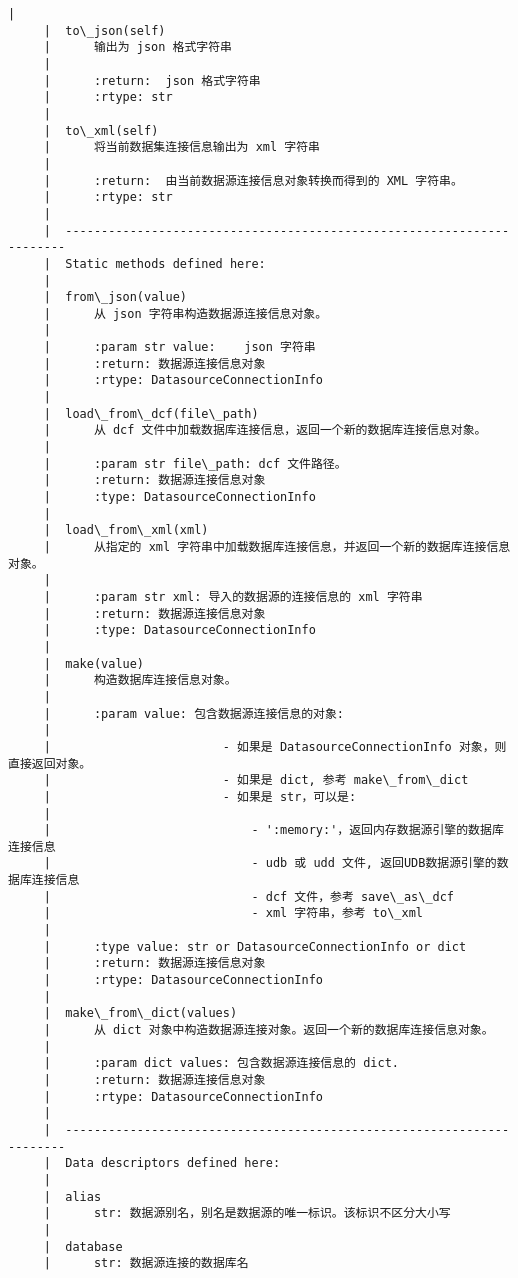 \documentclass[11pt]{article}
\begin{document}
\begin{Verbatim}[commandchars=\\\{\}]
     |  
     |  to\_json(self)
     |      输出为 json 格式字符串
     |      
     |      :return:  json 格式字符串
     |      :rtype: str
     |  
     |  to\_xml(self)
     |      将当前数据集连接信息输出为 xml 字符串
     |      
     |      :return:  由当前数据源连接信息对象转换而得到的 XML 字符串。
     |      :rtype: str
     |  
     |  ----------------------------------------------------------------------
     |  Static methods defined here:
     |  
     |  from\_json(value)
     |      从 json 字符串构造数据源连接信息对象。
     |      
     |      :param str value:    json 字符串
     |      :return: 数据源连接信息对象
     |      :rtype: DatasourceConnectionInfo
     |  
     |  load\_from\_dcf(file\_path)
     |      从 dcf 文件中加载数据库连接信息，返回一个新的数据库连接信息对象。
     |      
     |      :param str file\_path: dcf 文件路径。
     |      :return: 数据源连接信息对象
     |      :type: DatasourceConnectionInfo
     |  
     |  load\_from\_xml(xml)
     |      从指定的 xml 字符串中加载数据库连接信息，并返回一个新的数据库连接信息对象。
     |      
     |      :param str xml: 导入的数据源的连接信息的 xml 字符串
     |      :return: 数据源连接信息对象
     |      :type: DatasourceConnectionInfo
     |  
     |  make(value)
     |      构造数据库连接信息对象。
     |      
     |      :param value: 包含数据源连接信息的对象:
     |      
     |                        - 如果是 DatasourceConnectionInfo 对象，则直接返回对象。
     |                        - 如果是 dict, 参考 make\_from\_dict
     |                        - 如果是 str，可以是:
     |      
     |                            - ':memory:'，返回内存数据源引擎的数据库连接信息
     |                            - udb 或 udd 文件, 返回UDB数据源引擎的数据库连接信息
     |                            - dcf 文件，参考 save\_as\_dcf
     |                            - xml 字符串，参考 to\_xml
     |      
     |      :type value: str or DatasourceConnectionInfo or dict
     |      :return: 数据源连接信息对象
     |      :rtype: DatasourceConnectionInfo
     |  
     |  make\_from\_dict(values)
     |      从 dict 对象中构造数据源连接对象。返回一个新的数据库连接信息对象。
     |      
     |      :param dict values: 包含数据源连接信息的 dict.
     |      :return: 数据源连接信息对象
     |      :rtype: DatasourceConnectionInfo
     |  
     |  ----------------------------------------------------------------------
     |  Data descriptors defined here:
     |  
     |  alias
     |      str: 数据源别名，别名是数据源的唯一标识。该标识不区分大小写
     |  
     |  database
     |      str: 数据源连接的数据库名

\end{Verbatim}
\end{document}
